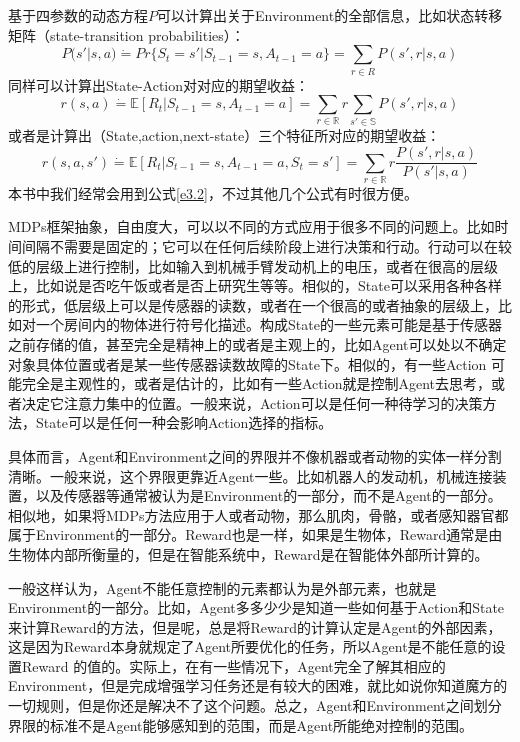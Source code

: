 \documentclass{ctexart}
\begin{document}
            基于四参数的动态方程$P$可以计算出关于Environment的全部信息，比如状态转移矩阵（state-transition probabilities）：
            \begin{equation}
                P(s'|s,a) \dot{=} Pr\{S_t=s'|S_{t-1}=s,A_{t-1}=a\} = \sum_{r\in R} P(s',r|s,a)
                \label{e3.4}
            \end{equation}
            同样可以计算出State-Action对对应的期望收益：
            \begin{equation}
                r(s,a) \dot{=} \mathbb{E} [R_t|S_{t-1}=s,A_{t-1}=a] = \sum_{r\in \mathbb{R}} r \sum_{s'\in \mathbb{S}} P(s',r|s,a)
                \label{e3.5}
            \end{equation}
            或者是计算出（State,action,next-state）三个特征所对应的期望收益：
            \begin{equation}
                r(s,a,s') \dot{=} \mathbb{E} [R_t|S_{t-1}=s,A_{t-1}=a,S_t=s'] = \sum_{r\in \mathbb{R}} r \frac{P(s',r|s,a)}{P(s'|s,a)}
                \label{e3.6}
            \end{equation}
            本书中我们经常会用到公式\ref{e3.2}，不过其他几个公式有时很方便。

            MDPs框架抽象，自由度大，可以以不同的方式应用于很多不同的问题上。比如时间间隔不需要是固定的；它可以在任何后续阶段上进行决策和行动。行动可以在较低的层级上进行控制，比如输入到机械手臂发动机上的电压，或者在很高的层级上，比如说是否吃午饭或者是否上研究生等等。相似的，State可以采用各种各样的形式，低层级上可以是传感器的读数，或者在一个很高的或者抽象的层级上，比如对一个房间内的物体进行符号化描述。构成State的一些元素可能是基于传感器之前存储的值，甚至完全是精神上的或者是主观上的，比如Agent可以处以不确定对象具体位置或者是某一些传感器读数故障的State下。相似的，有一些Action 可能完全是主观性的，或者是估计的，比如有一些Action就是控制Agent去思考，或者决定它注意力集中的位置。一般来说，Action可以是任何一种待学习的决策方法，State可以是任何一种会影响Action选择的指标。

            具体而言，Agent和Environment之间的界限并不像机器或者动物的实体一样分割清晰。一般来说，这个界限更靠近Agent一些。比如机器人的发动机，机械连接装置，以及传感器等通常被认为是Environment的一部分，而不是Agent的一部分。相似地，如果将MDPs方法应用于人或者动物，那么肌肉，骨骼，或者感知器官都属于Environment的一部分。Reward也是一样，如果是生物体，Reward通常是由生物体内部所衡量的，但是在智能系统中，Reward是在智能体外部所计算的。

            一般这样认为，Agent不能任意控制的元素都认为是外部元素，也就是Environment的一部分。比如，Agent多多少少是知道一些如何基于Action和State来计算Reward的方法，但是呢，总是将Reward的计算认定是Agent的外部因素，这是因为Reward本身就规定了Agent所要优化的任务，所以Agent是不能任意的设置Reward 的值的。实际上，在有一些情况下，Agent完全了解其相应的Environment，但是完成增强学习任务还是有较大的困难，就比如说你知道魔方的一切规则，但是你还是解决不了这个问题。总之，Agent和Environment之间划分界限的标准不是Agent能够感知到的范围，而是Agent所能绝对控制的范围。
\end{document}
